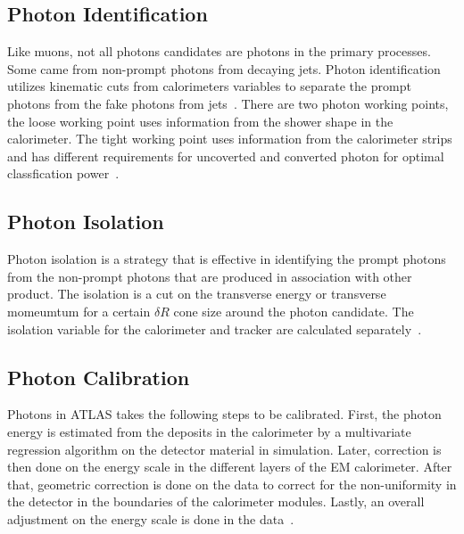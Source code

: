 \subsection{Photon Identification}
Like muons, not all photons candidates are photons in the primary processes. Some came from non-prompt photons from decaying jets. Photon identification utilizes kinematic cuts from calorimeters variables to separate the prompt photons from the fake photons from jets~\cite{gammaCalibration2019}.
There are two photon working points, the loose working point uses information from the shower shape in the calorimeter. The tight working point uses information from the calorimeter strips and has different requirements for uncoverted and converted photon for optimal classfication power~\cite{gammaCalibration2019}. 

\subsection{Photon Isolation}
Photon isolation is a strategy that is effective in identifying the prompt photons from the non-prompt photons that are produced in association with other product. The isolation is a cut on the transverse energy or transverse momeumtum for a certain $\delta R $ cone size around the photon candidate. The isolation variable for the calorimeter and tracker are calculated separately~\cite{gammaCalibration2019}.

%
%


\subsection{Photon Calibration}
Photons in ATLAS takes the following steps to be calibrated. 
First, the photon energy is estimated from the deposits in the calorimeter by a multivariate regression algorithm on the detector material in simulation. Later, correction is then done on the energy scale in the different layers of the EM calorimeter. After that, geometric correction is done on the data to correct for the non-uniformity in the detector in the boundaries of the calorimeter modules. Lastly, an overall adjustment on the energy scale is done in the data~\cite{gammaCalibration2019}.

